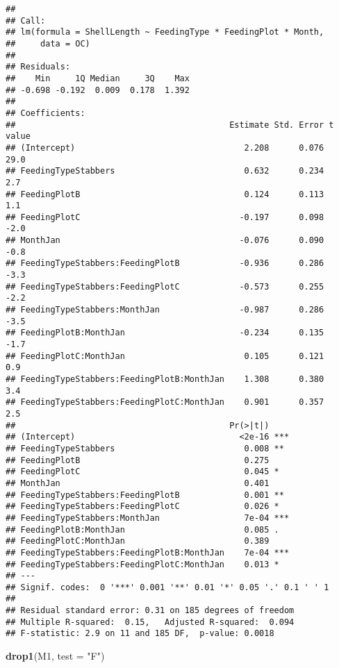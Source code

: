 \documentclass[]{article}
\newenvironment{Shaded}{\begin{snugshade}}{\end{snugshade}}
\newcommand{\KeywordTok}[1]{\textcolor[rgb]{0.13,0.29,0.53}{\textbf{#1}}}
\newcommand{\DataTypeTok}[1]{\textcolor[rgb]{0.13,0.29,0.53}{#1}}
\newcommand{\StringTok}[1]{\textcolor[rgb]{0.31,0.60,0.02}{#1}}
\newcommand{\NormalTok}[1]{#1}
\begin{document}
\begin{verbatim}
## 
## Call:
## lm(formula = ShellLength ~ FeedingType * FeedingPlot * Month, 
##     data = OC)
## 
## Residuals:
##    Min     1Q Median     3Q    Max 
## -0.698 -0.192  0.009  0.178  1.392 
## 
## Coefficients:
##                                           Estimate Std. Error t value
## (Intercept)                                  2.208      0.076    29.0
## FeedingTypeStabbers                          0.632      0.234     2.7
## FeedingPlotB                                 0.124      0.113     1.1
## FeedingPlotC                                -0.197      0.098    -2.0
## MonthJan                                    -0.076      0.090    -0.8
## FeedingTypeStabbers:FeedingPlotB            -0.936      0.286    -3.3
## FeedingTypeStabbers:FeedingPlotC            -0.573      0.255    -2.2
## FeedingTypeStabbers:MonthJan                -0.987      0.286    -3.5
## FeedingPlotB:MonthJan                       -0.234      0.135    -1.7
## FeedingPlotC:MonthJan                        0.105      0.121     0.9
## FeedingTypeStabbers:FeedingPlotB:MonthJan    1.308      0.380     3.4
## FeedingTypeStabbers:FeedingPlotC:MonthJan    0.901      0.357     2.5
##                                           Pr(>|t|)    
## (Intercept)                                 <2e-16 ***
## FeedingTypeStabbers                          0.008 ** 
## FeedingPlotB                                 0.275    
## FeedingPlotC                                 0.045 *  
## MonthJan                                     0.401    
## FeedingTypeStabbers:FeedingPlotB             0.001 ** 
## FeedingTypeStabbers:FeedingPlotC             0.026 *  
## FeedingTypeStabbers:MonthJan                 7e-04 ***
## FeedingPlotB:MonthJan                        0.085 .  
## FeedingPlotC:MonthJan                        0.389    
## FeedingTypeStabbers:FeedingPlotB:MonthJan    7e-04 ***
## FeedingTypeStabbers:FeedingPlotC:MonthJan    0.013 *  
## ---
## Signif. codes:  0 '***' 0.001 '**' 0.01 '*' 0.05 '.' 0.1 ' ' 1
## 
## Residual standard error: 0.31 on 185 degrees of freedom
## Multiple R-squared:  0.15,   Adjusted R-squared:  0.094 
## F-statistic: 2.9 on 11 and 185 DF,  p-value: 0.0018
\end{verbatim}

\begin{Shaded}
\begin{Highlighting}[]
\KeywordTok{drop1}\NormalTok{(M1, }\DataTypeTok{test =} \StringTok{"F"}\NormalTok{)}
\end{Highlighting}
\end{Shaded}
\end{document}
